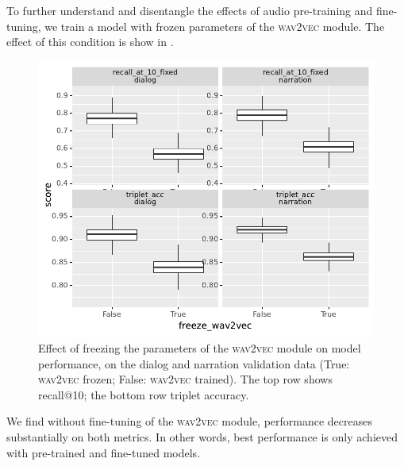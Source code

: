 To further understand and disentangle the effects of audio pre-training and 
fine-tuning, we train a model with frozen parameters of the 
\textsc{wav2vec} module. The effect of this condition is show in .
\begin{figure}[htb]
  \centering
  \includegraphics[width=\columnwidth]{results/ablations/freeze_wav2vec.pdf}
  \caption{Effect of freezing the parameters of the \textsc{wav2vec}
    module on model performance, on the dialog and narration
    validation data (True: \textsc{wav2vec} frozen; False:
    \textsc{wav2vec} trained). The top row
    shows recall@10; the bottom row triplet accuracy.}
  \label{fig:freeze_wav2vec}
\end{figure}
We find without fine-tuning of the \textsc{wav2vec} module, performance decreases substantially 
on both metrics. In other words, best performance is only achieved with pre-trained and 
fine-tuned models.



